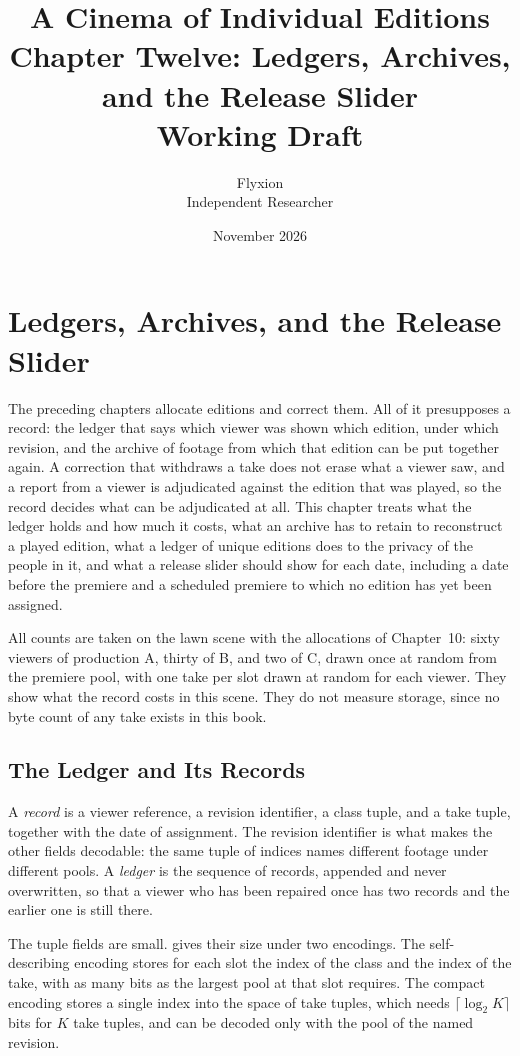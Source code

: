 \documentclass[11pt,twoside,openright]{book}
\title{\Huge\bfseries A Cinema of Individual Editions\\[1.2ex]
\large Chapter Twelve: Ledgers, Archives, and the Release Slider\\[0.4ex]
\large Working Draft}
\author{Flyxion\\[0.3ex]\small Independent Researcher}
\date{November 2026}
\theoremstyle{plain}
\theoremstyle{definition}
\theoremstyle{remark}
\begin{document}
\frontmatter
\maketitle
\tableofcontents
\mainmatter
\setcounter{chapter}{11}

\chapter{Ledgers, Archives, and the Release Slider}
\label{ch:ledger}

The preceding chapters allocate editions and correct them. All of it presupposes a record: the ledger that says which viewer was shown which edition, under which revision, and the archive of footage from which that edition can be put together again. A correction that withdraws a take does not erase what a viewer saw, and a report from a viewer is adjudicated against the edition that was played, so the record decides what can be adjudicated at all. This chapter treats what the ledger holds and how much it costs, what an archive has to retain to reconstruct a played edition, what a ledger of unique editions does to the privacy of the people in it, and what a release slider should show for each date, including a date before the premiere and a scheduled premiere to which no edition has yet been assigned.

All counts are taken on the lawn scene with the allocations of Chapter~10: sixty viewers of production A, thirty of B, and two of C, drawn once at random from the premiere pool, with one take per slot drawn at random for each viewer. They show what the record costs in this scene. They do not measure storage, since no byte count of any take exists in this book.

\section{The Ledger and Its Records}\label{sec:records}

A \emph{record} is a viewer reference, a revision identifier, a class tuple, and a take tuple, together with the date of assignment. The revision identifier is what makes the other fields decodable: the same tuple of indices names different footage under different pools. A \emph{ledger} is the sequence of records, appended and never overwritten, so that a viewer who has been repaired once has two records and the earlier one is still there.

The tuple fields are small.  gives their size under two encodings. The self-describing encoding stores for each slot the index of the class and the index of the take, with as many bits as the largest pool at that slot requires. The compact encoding stores a single index into the space of take tuples, which needs $\lceil\log_2 K\rceil$ bits for $K$ take tuples, and can be decoded only with the pool of the named revision.
\end{document}

